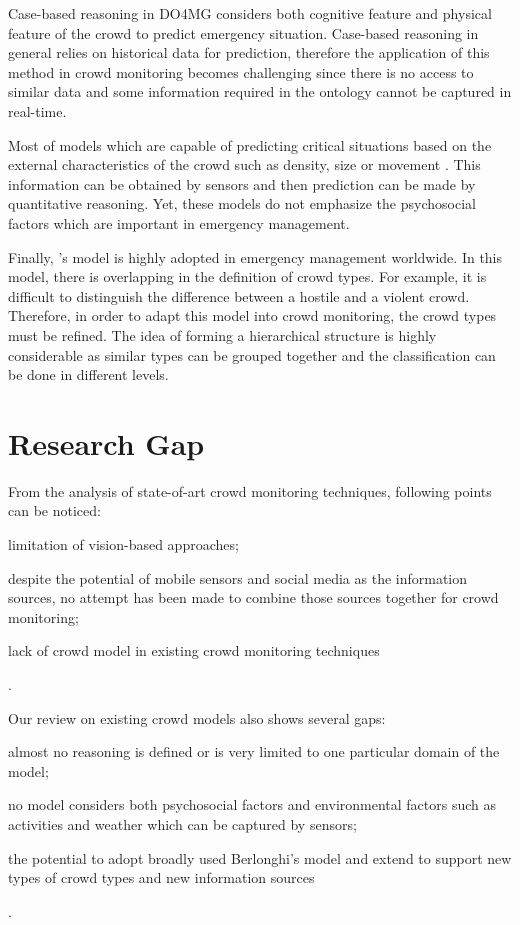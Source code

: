 Case-based reasoning in DO4MG \citep{DelirHaghighi2013a} considers both cognitive feature and physical feature of the crowd to predict emergency situation. Case-based reasoning in general relies on historical data for prediction, therefore the application of this method in crowd monitoring becomes challenging since there is no access to similar data and some information required in the ontology cannot be captured in real-time.

Most of models which are capable of predicting critical situations based on the external characteristics of the crowd such as density, size or movement \citep{Helbing2007,Lee2005}. This information can be obtained by sensors and then prediction can be made by quantitative reasoning. Yet, these models do not emphasize the psychosocial factors which are important in emergency management.

Finally, \citet{Berlonghi1995}’s model is highly adopted in emergency management worldwide. In this model, there is overlapping in the definition of crowd types. For example, it is difficult to distinguish the difference between a hostile and a violent crowd. Therefore, in order to adapt this model into crowd monitoring, the crowd types must be refined. The idea of forming a hierarchical structure \citep{Brown1954,Forsyth2009} is highly considerable as similar types can be grouped together and the classification can be done in different levels.

\section{Research Gap}
From the analysis of state-of-art crowd monitoring techniques, following points can be noticed:
\begin{inparaenum}[i)]
	\item limitation of vision-based approaches;
	\item despite the potential of mobile sensors and social media as the information sources, no attempt has been made to combine those sources together for crowd monitoring;
	\item lack of crowd model in existing crowd monitoring techniques
\end{inparaenum}.

Our review on existing crowd models also shows several gaps:
\begin{inparaenum}[i)]
	\item almost no reasoning is defined or is very limited to one particular domain of the model;
	\item no model considers both psychosocial factors and environmental factors such as activities and weather which can be captured by sensors;
	\item the potential to adopt broadly used Berlonghi’s model and extend to support new types of crowd types and new information sources
\end{inparaenum}.

